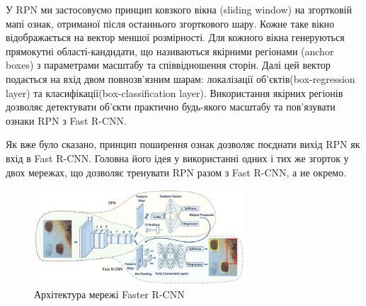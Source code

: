 У RPN ми застосовуємо принцип ковзкого вікна (sliding window) на згортковій мапі ознак,
отриманої після останнього згорткового шару. Кожне таке вікно відображається 
на вектор меншої розмірності. Для кожного вікна генеруються прямокутні області-кандидати, 
що називаються якірними регіонами (anchor boxes) з параметрами масштабу та співвідношення сторін.
Далі цей вектор подається на вхід двом повнозв'язним
шарам: локалізації об'єктів(box-regression layer) та класифікації(box-classification layer).
Використання якірних регіонів дозволяє детектувати об'єкти практично будь-якого масштабу та 
пов'язувати ознаки RPN з Fast R-CNN.

Як вже було сказано, принцип поширення ознак дозволяє поєднати вихід RPN як вхід в Fast R-CNN.
Головна його ідея у використанні одних і тих же згорток у двох мережах, що дозволяє тренувати 
RPN разом  з Fast R-CNN,  а не окремо.

\begin{figure}[H]
    \centering
    \includegraphics[width=0.7\textwidth]{images/cnn_faster_rcnn_architecture}
    \caption{Архітектура мережі Faster R-CNN \cite{faster_rcnn_website}
        \label{fig:cnn:faster_rcnn_architecture}
    }
\end{figure}


\clearpage